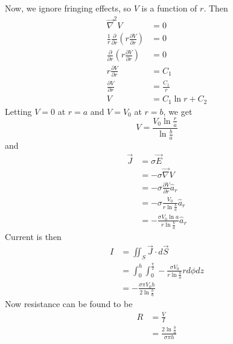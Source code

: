 \documentclass[answers]{exam}
\begin{document}
\begin{questions}
\begin{solution}
	Now, we ignore fringing effects, so $V$ is a function of $r$. Then
	\begin{align*}
		\vec \nabla^2 V &= 0 \\
		\frac{1}{r} \frac{\partial}{\partial r}\left(r\frac{\partial V}{\partial r}\right) &= 0 \\
		\frac{\partial}{\partial r}\left(r\frac{\partial V}{\partial r}\right) &= 0 \\
		r\frac{\partial V}{\partial r} &= C_1 \\
		\frac{\partial V}{\partial r} &= \frac{C_1}{r} \\
		V &= C_1\ln r + C_2
	\end{align*}
	Letting $V=0$ at $r=a$ and $V=V_0$ at $r=b$, we get
	$$V = \frac{V_0\ln\frac{r}{a}}{\ln\frac{b}{a}}$$
	and
	\begin{align*}
		\vec J &= \sigma \vec E \\
		       &= -\sigma \vec \nabla V \\
		       &= -\sigma \frac{\partial V}{\partial r} \hat a_r \\
		       &= -\sigma \frac{V_0}{r\ln\frac{b}{a}} \hat a_r \\
		       &= -\frac{\sigma V_0\ln a}{r\ln\frac{b}{a}} \hat a_r
	\end{align*}
	Current is then
	\begin{align*}
		I &= \iint_S \vec J \cdot d\vec S \\
		  &= \int_0^h \int_0^{\frac{\pi}{2}} -\frac{\sigma V_0}{r\ln\frac{b}{a}} rd\phi dz \\
		  &= -\frac{\sigma\pi V_0h}{2\ln\frac{b}{a}}
	\end{align*}
	Now resistance can be found to be
	\begin{align*}
		R &= \frac{V}{I} \\
		  &= \frac{2\ln\frac{b}{a}}{\sigma\pi h}
	\end{align*}
\end{solution}



\end{questions}
\end{document}
